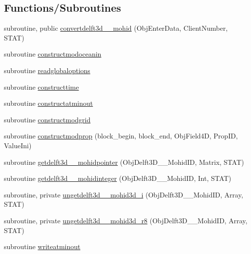 \subsection*{Functions/\+Subroutines}
\begin{DoxyCompactItemize}
\item 
subroutine, public \mbox{\hyperlink{namespacemoduledelft3d__2__mohid_a03b75d6d9aec2bf65fd05cc9aaec61ab}{convertdelft3d\+\_\+\_\+mohid}} (Obj\+Enter\+Data, Client\+Number, S\+T\+AT)
\item 
subroutine \mbox{\hyperlink{namespacemoduledelft3d__2__mohid_ab33b3699f757f82a3a7ef54bc7cc7061}{constructmodoceanin}}
\item 
subroutine \mbox{\hyperlink{namespacemoduledelft3d__2__mohid_aa82a4835cdddf9eddf65ba75c51cff92}{readglobaloptions}}
\item 
subroutine \mbox{\hyperlink{namespacemoduledelft3d__2__mohid_a6272b392fbc31727600ca81ee8fe5d43}{constructtime}}
\item 
subroutine \mbox{\hyperlink{namespacemoduledelft3d__2__mohid_a7da2fd030b83e9111c17fd1699358aea}{constructatminout}}
\item 
subroutine \mbox{\hyperlink{namespacemoduledelft3d__2__mohid_aff52824d2be1932406d107d88fa23498}{constructmodgrid}}
\item 
subroutine \mbox{\hyperlink{namespacemoduledelft3d__2__mohid_a39e0d7490596c9b34419ca060790d641}{constructmodprop}} (block\+\_\+begin, block\+\_\+end, Obj\+Field4D, Prop\+ID, Value\+Ini)
\item 
subroutine \mbox{\hyperlink{namespacemoduledelft3d__2__mohid_a13721b790965b5497115a3fa554de497}{getdelft3d\+\_\+\_\+mohidpointer}} (Obj\+Delft3\+D\+\_\+\_\+\+Mohid\+ID, Matrix, S\+T\+AT)
\item 
subroutine \mbox{\hyperlink{namespacemoduledelft3d__2__mohid_a5500fdcc30972ef82a49b8924a5a44fe}{getdelft3d\+\_\+\_\+mohidinteger}} (Obj\+Delft3\+D\+\_\+\_\+\+Mohid\+ID, Int, S\+T\+AT)
\item 
subroutine, private \mbox{\hyperlink{namespacemoduledelft3d__2__mohid_aa4cca39e63d47844aa594f71d019af8c}{ungetdelft3d\+\_\+\_\+mohid3d\+\_\+i}} (Obj\+Delft3\+D\+\_\+\_\+\+Mohid\+ID, Array, S\+T\+AT)
\item 
subroutine, private \mbox{\hyperlink{namespacemoduledelft3d__2__mohid_a54e3fcc0277aae3ad660ec439e7e4a3c}{ungetdelft3d\+\_\+\_\+mohid3d\+\_\+r8}} (Obj\+Delft3\+D\+\_\+\_\+\+Mohid\+ID, Array, S\+T\+AT)
\item 
subroutine \mbox{\hyperlink{namespacemoduledelft3d__2__mohid_aaf8ed07f19208b8787807cb35199dca4}{writeatminout}}

\end{DoxyCompactItemize}
